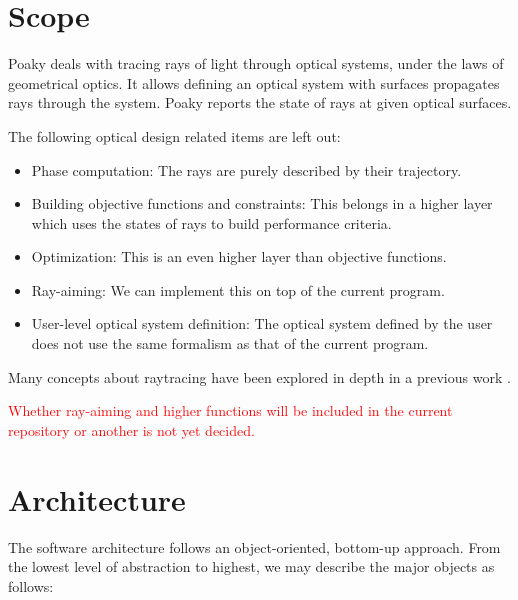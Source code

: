 \section{Scope}
Poaky deals with tracing rays of light through optical systems,
under the laws of geometrical optics. It allows defining an optical system
with surfaces propagates rays through the system. Poaky reports the
state of rays at given optical surfaces.

The following optical design related items are left out:
\begin{itemize}
\item Phase computation: The rays are purely described by their trajectory.
\item Building objective functions and constraints: This belongs in a higher
layer which uses the states of rays to build performance criteria.
\item Optimization: This is an even higher layer than objective functions.
\item Ray-aiming: We can implement this on top of the current program.
\item User-level optical system definition: The optical system defined
      by the user does not use the same formalism as that of the current
      program.
\end{itemize}

Many concepts about raytracing have been explored in depth in a previous
work \cite{Houllier-thesis}.

\textcolor{red}{Whether ray-aiming and higher functions will be included
in the current repository or another is not yet decided.}

\section{Architecture}
The software architecture follows an object-oriented, bottom-up approach.
From the lowest level of abstraction to highest, we may describe the
major objects as follows:

